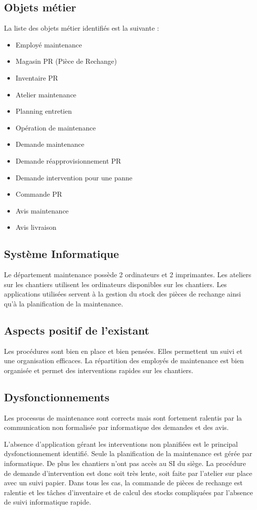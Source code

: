 \subsection{Objets métier}
La liste des objets métier identifiés est la suivante :
\begin{itemize}
\item Employé maintenance
\item Magasin PR (Pièce de Rechange)
\item Inventaire PR
\item Atelier maintenance
\item Planning entretien
\item Opération de maintenance
\item Demande maintenance
\item Demande réapprovisionnement PR
\item Demande intervention pour une panne
\item Commande PR
\item Avis maintenance
\item Avis livraison
\end{itemize}

\subsection{Système Informatique}
Le département maintenance possède 2 ordinateurs et 2 imprimantes.
Les ateliers sur les chantiers utilisent les ordinateurs disponibles sur les
chantiers.
Les applications utilisées servent à la gestion du stock des pièces de rechange
ainsi qu'à la planification de la maintenance.

\subsection{Aspects positif de l'existant}

Les procédures sont bien en place et bien pensées. Elles permettent un suivi
et une organisation efficaces.
La répartition des employés de maintenance est bien organisée et permet
des interventions rapides sur les chantiers.

\subsection{Dysfonctionnements}
Les processus de maintenance sont corrects mais sont fortement ralentis par
la communication non formalisée par informatique des demandes et des avis.

L'absence d'application gérant les interventions non planifiées est le principal
dysfonctionnement identifié. Seule la planification de la maintenance est gérée
par informatique. De plus les chantiers n'ont pas accès au SI du siège. La 
procédure de demande d'intervention est donc soit très lente, soit faite par
l'atelier sur place avec un suivi papier. Dans tous les cas, la commande de 
pièces de rechange est ralentie et les tâches d'inventaire et de calcul des
stocks compliquées par l'absence de suivi informatique rapide.
